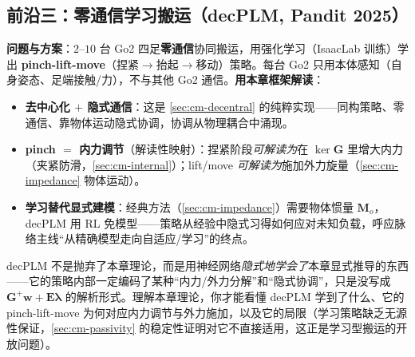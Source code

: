 \subsection{前沿三：零通信学习搬运（decPLM, Pandit 2025）}
\label{sec:cm-frontier-decplm}
\textbf{问题与方案}：$2$--$10$ 台 Go2 四足\textbf{零通信}协同搬运，用强化学习（IsaacLab 训练）学出 \textbf{pinch-lift-move}（捏紧$\to$抬起$\to$移动）策略\cite{pandit2025decplm}。每台 Go2 只用本体感知（自身姿态、足端接触/力），不与其他 Go2 通信。\textbf{用本章框架解读}：
\begin{itemize}
  \item \textbf{去中心化 $+$ 隐式通信}：这是 \cref{sec:cm-decentral} 的纯粹实现——同构策略、零通信、靠物体运动隐式协调，协调从物理耦合中涌现。
  \item \textbf{pinch $=$ 内力调节}（解读性映射）：捏紧阶段\emph{可解读为}在 $\ker\mathbf{G}$ 里增大内力（夹紧防滑，\cref{sec:cm-internal}）；lift/move \emph{可解读为}施加外力旋量（\cref{sec:cm-impedance} 物体运动）。
  \item \textbf{学习替代显式建模}：经典方法（\cref{sec:cm-impedance}）需要物体惯量 $\mathbf{M}_o$，decPLM 用 RL 免模型——策略从经验中隐式习得如何应对未知负载，呼应脉络主线“从精确模型走向自适应/学习”的终点。
\end{itemize}

\begin{insight}
decPLM 不是抛弃了本章理论，而是用神经网络\emph{隐式地学会了}本章显式推导的东西——它的策略内部一定编码了某种“内力/外力分解”和“隐式协调”，只是没写成 $\mathbf{G}^{+}\mathbf{w}+\mathbf{E}\boldsymbol{\lambda}$ 的解析形式。理解本章理论，你才能看懂 decPLM 学到了什么、它的 pinch-lift-move 为何对应内力调节与外力施加，以及它的局限（学习策略缺乏无源性保证，\cref{sec:cm-passivity} 的稳定性证明对它不直接适用，这正是学习型搬运的开放问题）。
\end{insight}

